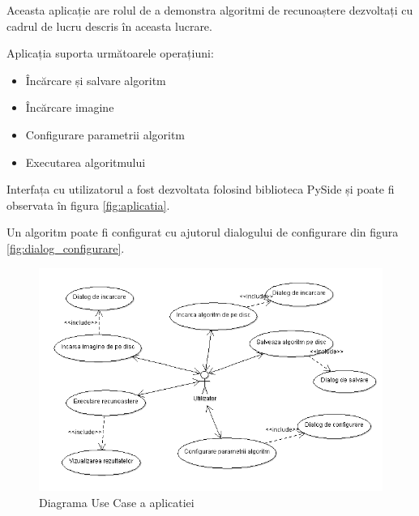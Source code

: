 
Aceasta aplicație are rolul de a demonstra algoritmi de recunoaștere dezvoltați cu cadrul de lucru descris în aceasta lucrare.

Aplicația suporta următoarele operațiuni:
\begin{itemize}
	\item Încărcare și salvare algoritm
	\item Încărcare imagine
	\item Configurare parametrii algoritm
	\item Executarea algoritmului
\end{itemize}

Interfața cu utilizatorul a fost dezvoltata folosind biblioteca PySide și poate fi observata în figura \ref{fig:aplicatia}.

Un algoritm poate fi configurat cu ajutorul dialogului de configurare din figura \ref{fig:dialog_configurare}.

\begin{figure}[H]
	\centering
		\includegraphics[width=1.00\textwidth]{uml/aplicatie_use_case.png}
	\caption{Diagrama Use Case a aplicatiei}
	\label{fig:aplicatie_use_case}
\end{figure}

